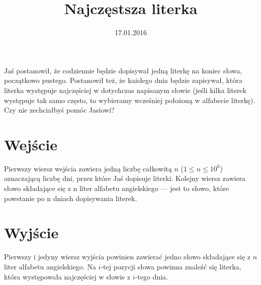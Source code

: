 \documentclass[zad,zawodnik,utf8]{sinol}
\title{Najczęstsza literka}
\author{} %
\date{17.01.2016}
\begin{document}
\begin{tasktext}%
Jaś postanowił, że codziennie będzie dopisywał jedną literkę na koniec słowa, początkowo pustego. Postanowił też, że każdego dnia będzie zapisywał, która literka występuje najczęściej w dotychczas napisanym słowie (jeśli kilka literek występuje tak samo często, to wybieramy wcześniej położoną w alfabecie literkę). Czy nie zechciałbyś pomóc Jasiowi?

  \section{Wejście}
Pierwszy wiersz wejścia zawiera jedną liczbę całkowitą $n$ ($1 \leq n \leq 10^6 $) oznaczającą liczbę dni, przez które Jaś dopisuje literki. Kolejny wiersz zawiera słowo składające się z n liter alfabetu angielskiego — jest to słowo, które powstanie po n dniach dopisywania literek.


  \section{Wyjście}
Pierwszy i jedyny wiersz wyjścia powinien zawierać jedno słowo składające się z $n$ liter alfabetu angielskiego. Na $i$-tej pozycji słowa powinna znaleźć się literka, która występowała najczęściej w słowie z $i$-tego dnia.

\makecompactexample

\end{tasktext}
\end{document}
